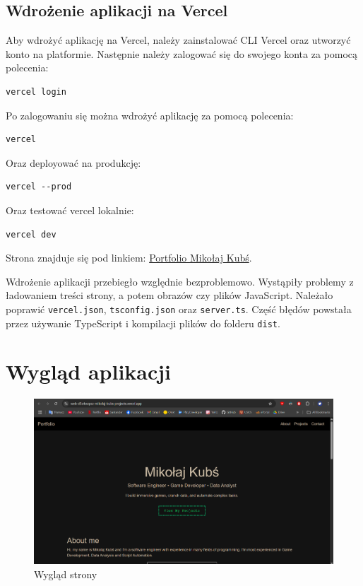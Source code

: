 \documentclass[a4paper,12pt]{article}
\begin{document}
\subsection{Wdrożenie aplikacji na Vercel}
Aby wdrożyć aplikację na Vercel, należy zainstalować CLI Vercel oraz utworzyć konto na platformie. Następnie należy zalogować się do swojego konta za pomocą polecenia:
\begin{lstlisting}
vercel login
\end{lstlisting}
Po zalogowaniu się można wdrożyć aplikację za pomocą polecenia:
\begin{lstlisting}
vercel
\end{lstlisting}
Oraz deployować na produkcję:
\begin{lstlisting}
vercel --prod
\end{lstlisting}
Oraz testować vercel lokalnie:
\begin{lstlisting}
vercel dev
\end{lstlisting}
Strona znajduje się pod linkiem: \href{https://web-app-five-dusky.vercel.app/}{Portfolio Mikołaj Kubś}.

Wdrożenie aplikacji przebiegło względnie bezproblemowo. Wystąpiły problemy z ładowaniem treści strony, a potem obrazów czy plików JavaScript. Należało poprawić \texttt{vercel.json}, \texttt{tsconfig.json} oraz \texttt{server.ts}. Część błędów powstała przez używanie TypeScript i kompilacji plików do folderu \texttt{dist}.

\section{Wygląd aplikacji}

\begin{figure}[H]
    \centering
    \includegraphics[width=1\textwidth]{images/page_top.png}
    \caption{Wygląd strony}
\end{figure}
\end{document}
